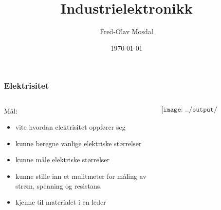 \documentclass[aspectratio=169,xcolor=dvipsnames]{beamer}
\title[Industrielektronikk]{Industrielektronikk} %
\author[Fred-Olav] {Fred-Olav Mosdal}
\institute[Gand VGS] %
{
    Gand VGS \\
    VG1 TIF }
\date{\today} %
\begin{document}
\begin{frame}
\titlepage
\end{frame}




\begin{frame}
	\frametitle{Elektrisitet}

	\begin{columns}
		\begin{column}{0.5\textwidth}
			Mål:
			\begin{itemize}
				\item vite hvordan elektrisitet oppfører seg
				\item kunne beregne vanlige elektriske størrelser
				\item kunne måle elektriske størrelser
				\item kunne stille inn et mulitmeter for måling av strøm, spenning og resistans. 
				\item kjenne til materialet i en leder
			\end{itemize}
		\end{column}

		\begin{column}{0.5\textwidth}
			$$\texttt{[image: ../output/noGPLimages/tifel01.png]}$$
		\end{column}
	\end{columns}
\end{frame}
\end{document}
